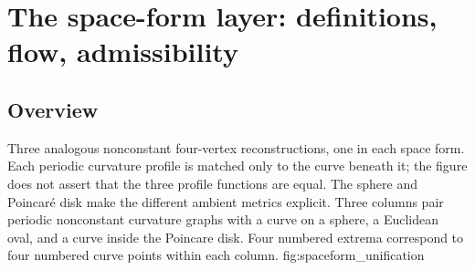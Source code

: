 \chapter{The space-form layer: definitions, flow, admissibility}
\label{chap:spaceform_core}

%

\section{Overview}

  {Three analogous nonconstant four-vertex reconstructions, one in each space
   form. Each periodic curvature profile is matched only to the curve beneath
   it; the figure does not assert that the three profile functions are equal.
   The sphere and Poincaré disk make the different ambient metrics explicit.}
  {Three columns pair periodic nonconstant curvature graphs with a curve on a
   sphere, a Euclidean oval, and a curve inside the Poincare disk. Four numbered
   extrema correspond to four numbered curve points within each column.}
  {fig:spaceform_unification}

